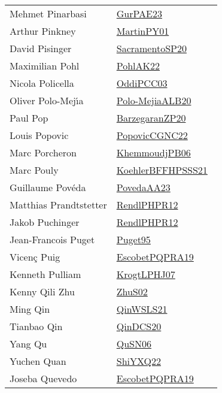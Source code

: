 {\begin{longtable}{p{4cm}p{20cm}}
Mehmet Pinarbasi & \href{works/GurPAE23.pdf}{GurPAE23}~\cite{GurPAE23}\\
Arthur Pinkney & \href{works/MartinPY01.pdf}{MartinPY01}~\cite{MartinPY01}\\
David Pisinger & \href{works/SacramentoSP20.pdf}{SacramentoSP20}~\cite{SacramentoSP20}\\
Maximilian Pohl & \href{works/PohlAK22.pdf}{PohlAK22}~\cite{PohlAK22}\\
Nicola Policella & \href{works/OddiPCC03.pdf}{OddiPCC03}~\cite{OddiPCC03}\\
Oliver Polo{-}Mej{\'{\i}}a & \href{works/Polo-MejiaALB20.pdf}{Polo-MejiaALB20}~\cite{Polo-MejiaALB20}\\
Paul Pop & \href{works/BarzegaranZP20.pdf}{BarzegaranZP20}~\cite{BarzegaranZP20}\\
Louis Popovic & \href{works/PopovicCGNC22.pdf}{PopovicCGNC22}~\cite{PopovicCGNC22}\\
Marc Porcheron & \href{works/KhemmoudjPB06.pdf}{KhemmoudjPB06}~\cite{KhemmoudjPB06}\\
Marc Pouly & \href{works/KoehlerBFFHPSSS21.pdf}{KoehlerBFFHPSSS21}~\cite{KoehlerBFFHPSSS21}\\
Guillaume Pov{\'{e}}da & \href{works/PovedaAA23.pdf}{PovedaAA23}~\cite{PovedaAA23}\\
Matthias Prandtstetter & \href{works/RendlPHPR12.pdf}{RendlPHPR12}~\cite{RendlPHPR12}\\
Jakob Puchinger & \href{works/RendlPHPR12.pdf}{RendlPHPR12}~\cite{RendlPHPR12}\\
Jean{-}Francois Puget & \href{works/Puget95.pdf}{Puget95}~\cite{Puget95}\\
Vicen{\c{c}} Puig & \href{works/EscobetPQPRA19.pdf}{EscobetPQPRA19}~\cite{EscobetPQPRA19}\\
Kenneth Pulliam & \href{works/KrogtLPHJ07.pdf}{KrogtLPHJ07}~\cite{KrogtLPHJ07}\\
Kenny Qili Zhu & \href{works/ZhuS02.pdf}{ZhuS02}~\cite{ZhuS02}\\
Ming Qin & \href{works/QinWSLS21.pdf}{QinWSLS21}~\cite{QinWSLS21}\\
Tianbao Qin & \href{works/QinDCS20.pdf}{QinDCS20}~\cite{QinDCS20}\\
Yang Qu & \href{works/QuSN06.pdf}{QuSN06}~\cite{QuSN06}\\
Yuchen Quan & \href{}{ShiYXQ22}~\cite{ShiYXQ22}\\
Joseba Quevedo & \href{works/EscobetPQPRA19.pdf}{EscobetPQPRA19}~\cite{EscobetPQPRA19}\\

\end{longtable}}
